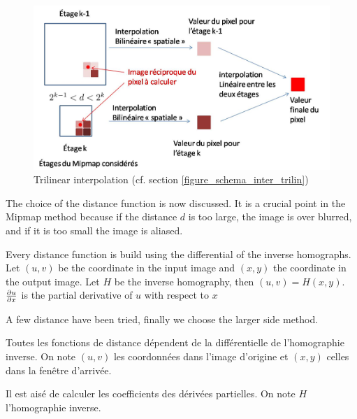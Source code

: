\label{figure_schema_inter_trilin}
\begin{figure}[h!]
\centering
\includegraphics[scale=0.5]{intertrilineaire.jpg}
\caption{Trilinear interpolation (cf. section \ref{figure_schema_inter_trilin})}
\label{intertrilineaire}
\end{figure}

\label{fonctiondistance}

The choice of the distance function is now discussed. It is a crucial point in the Mipmap method because if the distance $d$ is too large, the image is over blurred, and if it is too small the image is aliased.

Every distance function is build using the differential of the inverse homographs. Let $(u,v)$ be the coordinate in the input image and $(x,y)$ the coordinate in the output image. Let $H$ be the inverse homography, then $(u,v)=H(x,y)$. $\frac{\partial u}{\partial x}$ is the partial derivative of $u$ with respect to $x$

A few distance have been tried, finally we choose the larger side method.




Toutes les fonctions de distance dépendent de la différentielle de l'homographie inverse.
On note $(u,v)$ les coordonnées dans l'image d'origine et $(x,y)$ celles dans la fenêtre d'arrivée.

Il est aisé de calculer les coefficients des dérivées partielles. On note $H$ l'homographie inverse.

